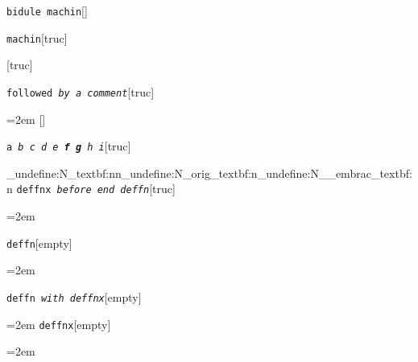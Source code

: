 \documentclass{book}
\begin{document}
%
\noindent\texttt{bidule machin}\hfill[]



%
\noindent\texttt{machin}\hfill[truc]



%
\noindent\texttt{}\hfill[truc]



\noindent\texttt{followed \EmbracOn{}\textnormal{\textsl{by a comment}}\EmbracOff{}}\hfill[truc]



%
\par\begingroup\obeylines\obeyspaces\frenchspacing\leftskip=2em\relax\parskip=0pt\relax\ttfamily{}%
\endgroup{}%
\noindent\texttt{}\hfill[]



\noindent\texttt{a \EmbracOn{}\textnormal{\textsl{b c d e \textbf{f g} h i}}\EmbracOff{}}\hfill[truc]


\ExplSyntaxOn%
\cs_undefine:N{\embrac_textbf:nn}\cs_undefine:N{\embrac_orig_textbf:n}\cs_undefine:N{\__embrac_textbf:n}%
\ExplSyntaxOff%
%
\noindent\texttt{deffnx \EmbracOn{}\textnormal{\textsl{before end deffn}}\EmbracOff{}}\hfill[truc]



%
\par\begingroup\obeylines\obeyspaces\frenchspacing\leftskip=2em\relax\parskip=0pt\relax\ttfamily{}%


\endgroup{}%
\noindent\texttt{deffn}\hfill[empty]



%
\par\begingroup\obeylines\obeyspaces\frenchspacing\leftskip=2em\relax\parskip=0pt\relax\ttfamily{}%

\endgroup{}%
\noindent\texttt{deffn \EmbracOn{}\textnormal{\textsl{with deffnx}}\EmbracOff{}}\hfill[empty]



%
\par\begingroup\obeylines\obeyspaces\frenchspacing\leftskip=2em\relax\parskip=0pt\relax\ttfamily{}%
\endgroup{}%
\noindent\texttt{deffnx}\hfill[empty]



%
\par\begingroup\obeylines\obeyspaces\frenchspacing\leftskip=2em\relax\parskip=0pt\relax\ttfamily{}%
\end{document}
